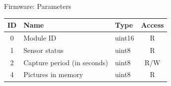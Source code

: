 \begin{frame}{Firmware: Parameters}

\begin{table}[!htb]
    \centering
    \label{tab:parameters}
    \begin{tabular}{cllc}
        \toprule[1.5pt]
        \textbf{ID} & \textbf{Name} & \textbf{Type} & \textbf{Access} \\
        \midrule
        0 & Module ID                   & uint16 & R\\
        1 & Sensor status               & uint8  & R  \\
        2 & Capture period (in seconds) & uint8  & R/W \\
        4 & Pictures in memory          & uint8  & R \\
        \bottomrule[1.5pt]
    \end{tabular}
\end{table}

\end{frame}


